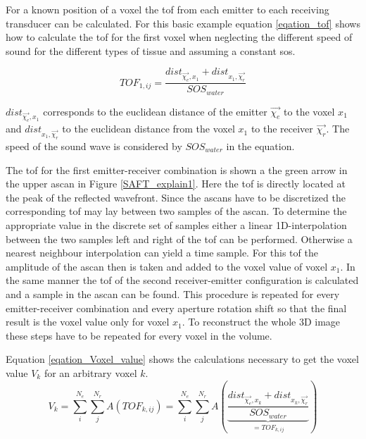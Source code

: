 For a known position of a voxel the \ac{tof} from each emitter to each receiving transducer can be calculated. For this basic example equation \ref{eqation_tof} shows how to calculate the \ac{tof} for the first voxel when neglecting the different speed of sound for the different types of tissue and assuming a constant \ac{sos}.

\begin{equation}
TOF_{1,ij} =  \frac{dist_{\overrightarrow{{\chi_e }},x_1} + dist_{x_1,\overrightarrow{{\chi_r }}} }{ SOS_{water} } 
\label{eqation_tof}
\end{equation}

$dist_{\overrightarrow{{\chi_e }},x_1}$ corresponds to the euclidean distance of the emitter $\overrightarrow{{\chi_e }}$ to the voxel $x_1$ and $dist_{x_1,\overrightarrow{{\chi_r }}}$ to the euclidean distance from the voxel $x_1$ to the receiver $\overrightarrow{{\chi_r }}$.
The speed of the sound wave is considered by $SOS_{water}$ in the equation.

The \ac{tof} for the first emitter-receiver combination is shown a the green arrow in the upper \ac{ascan} in Figure \ref{SAFT_explain1}. Here the \ac{tof} is directly located at the peak of the reflected wavefront. Since the \acp{ascan} have to be discretized the corresponding \ac{tof} may lay between two samples of the \ac{ascan}. To determine the appropriate value in the discrete set of samples either a linear 1D-interpolation between the two samples left and right of the \ac{tof} can be performed. Otherwise a nearest neighbour interpolation can yield a time sample.
For this \ac{tof} the amplitude of the \ac{ascan} then is taken and added to the voxel value of voxel $x_1$. 
In the same manner the \ac{tof} of the second receiver-emitter configuration is calculated and a sample in the \ac{ascan} can be found.
This procedure is repeated for every emitter-receiver combination and every aperture rotation shift so that the final result is the voxel value only for voxel $x_1$.
To reconstruct the whole 3D image these steps have to be repeated for every voxel in the volume.

Equation \ref{eqation_Voxel_value} shows the calculations necessary to get the voxel value $V_k$ for an arbitrary voxel $k$. 
\begin{equation}
V_k = \sum_{i}^{N_e}\sum_{j}^{N_r} A(TOF_{k,ij}) = \sum_{i}^{N_e}\sum_{j}^{N_r} A \left (\underset{ = TOF_{k,ij} } {\underbrace{\frac{ dist_{\overrightarrow{{\chi_e }},x_k} + dist_{x_k,\overrightarrow{{\chi_r }}}}{SOS_{water}} }}  \right )
\label{eqation_Voxel_value}
\end{equation}

